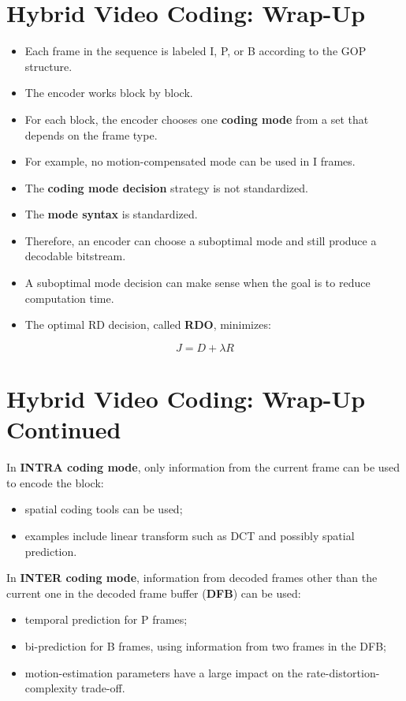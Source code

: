 \section{Hybrid Video Coding: Wrap-Up}

\begin{itemize}
\item Each frame in the sequence is labeled I, P, or B according to the GOP structure.
\item The encoder works block by block.
\item For each block, the encoder chooses one \textbf{coding mode} from a set that depends on the frame type.
\item For example, no motion-compensated mode can be used in I frames.
\item The \textbf{coding mode decision} strategy is not standardized.
\item The \textbf{mode syntax} is standardized.
\item Therefore, an encoder can choose a suboptimal mode and still produce a decodable bitstream.
\item A suboptimal mode decision can make sense when the goal is to reduce computation time.
\item The optimal RD decision, called \textbf{RDO}, minimizes:
\end{itemize}

\[
J = D + \lambda R
\]

\section{Hybrid Video Coding: Wrap-Up Continued}

In \textbf{INTRA coding mode}, only information from the current frame can be used to encode the block:

\begin{itemize}
\item spatial coding tools can be used;
\item examples include linear transform such as DCT and possibly spatial prediction.
\end{itemize}

In \textbf{INTER coding mode}, information from decoded frames other than the current one in the decoded frame buffer (\textbf{DFB}) can be used:

\begin{itemize}
\item temporal prediction for P frames;
\item bi-prediction for B frames, using information from two frames in the DFB;
\item motion-estimation parameters have a large impact on the rate-distortion-complexity trade-off.
\end{itemize}


